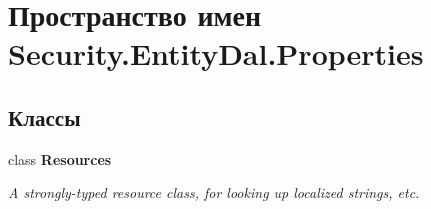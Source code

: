 \hypertarget{namespace_security_1_1_entity_dal_1_1_properties}{}\section{Пространство имен Security.\+Entity\+Dal.\+Properties}
\label{namespace_security_1_1_entity_dal_1_1_properties}
\subsection*{Классы}
\begin{DoxyCompactItemize}
\item 
class {\bfseries Resources}
\begin{DoxyCompactList}\small\item\em A strongly-\/typed resource class, for looking up localized strings, etc. \end{DoxyCompactList}\end{DoxyCompactItemize}

